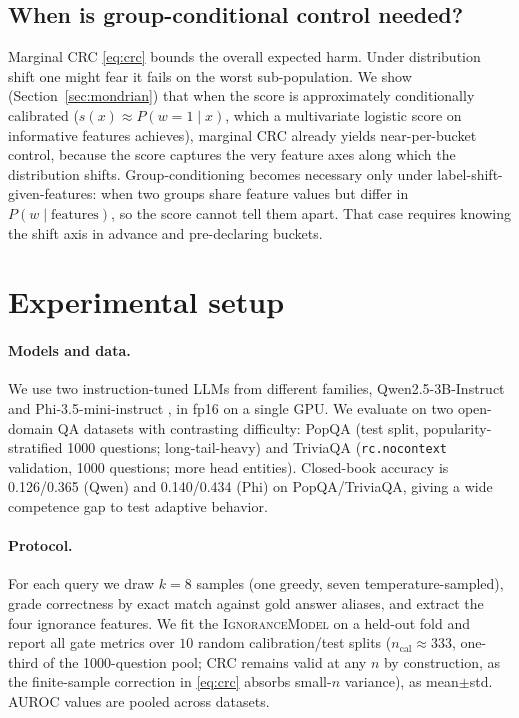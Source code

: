 \documentclass[a4paper,fleqn]{cas-dc}
\begin{document}
\subsection{When is group-conditional control needed?}\label{sec:mondrian-method}

Marginal CRC \eqref{eq:crc} bounds the overall expected harm. Under
distribution shift one might fear it fails on the worst sub-population. We show
(Section~\ref{sec:mondrian}) that when the score is approximately conditionally
calibrated ($s(x)\approx P(w=1\mid x)$, which a multivariate logistic score on
informative features achieves), marginal CRC already yields near-per-bucket
control, because the score captures the very feature axes along which the
distribution shifts. Group-conditioning becomes necessary only under
label-shift-given-features: when two groups share feature values but
differ in $P(w\mid\text{features})$, so the score cannot tell them apart. That
case requires knowing the shift axis in advance and pre-declaring buckets.

\section{Experimental setup}\label{sec:setup}

\paragraph{Models and data.} We use two instruction-tuned LLMs from different
families, Qwen2.5-3B-Instruct \citep{qwen2025technical} and Phi-3.5-mini-instruct
\citep{abdin2024phi3}, in fp16 on a single GPU. We evaluate on two open-domain
QA datasets with contrasting difficulty: PopQA \citep{mallen2023popqa} (test
split, popularity-stratified 1000 questions; long-tail-heavy) and TriviaQA
\citep{joshi2017triviaqa} (\texttt{rc.nocontext} validation, 1000 questions;
more head entities). Closed-book accuracy is 0.126/0.365 (Qwen) and 0.140/0.434
(Phi) on PopQA/TriviaQA, giving a wide competence gap to test adaptive
behavior.

\paragraph{Protocol.} For each query we draw $k=8$ samples (one greedy, seven
temperature-sampled), grade correctness by exact match against gold answer
aliases, and extract the four ignorance features. We fit the
\textsc{IgnoranceModel} on a held-out fold and report all gate metrics over $10$
random calibration/test splits ($n_{\text{cal}}\approx333$, one-third of the
1000-question pool; CRC remains valid at any $n$ by construction, as the
finite-sample correction in \eqref{eq:crc} absorbs small-$n$ variance), as
mean$\pm$std. AUROC values are pooled across datasets.
\end{document}
